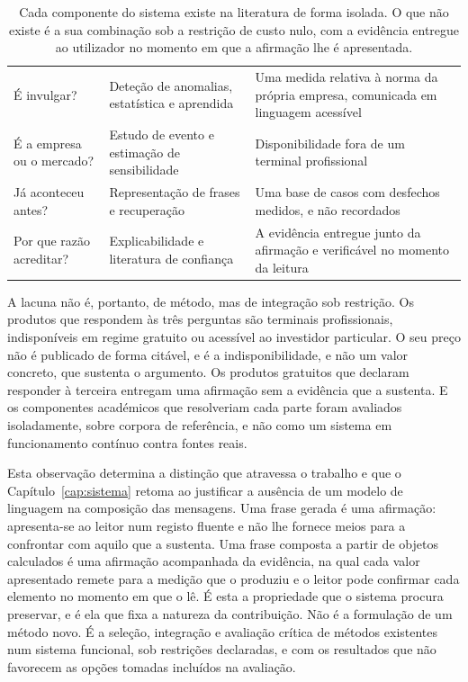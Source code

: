 \begin{table}[!htbp]
\caption[Posicionamento do trabalho face à literatura]{Cada componente do sistema existe na
literatura de forma isolada. O que não existe é a sua combinação sob a restrição de custo nulo, com
a evidência entregue ao utilizador no momento em que a afirmação lhe é apresentada.}
\label{tab:ctx_posicionamento}
\centering
\small
\begin{tabular}{L{0.24\textwidth} L{0.30\textwidth} L{0.34\textwidth}}
\toprule
{} &  &  \\
\midrule
É invulgar?
  & Deteção de anomalias, estatística e aprendida \autocite{chandola2009anomaly, liu2008isolation}
  & Uma medida relativa à norma da própria empresa, comunicada em linguagem acessível \\
\addlinespace
É a empresa ou o mercado?
  & Estudo de evento e estimação de sensibilidade \autocite{brown1985daily, vasicek1973beta}
  & Disponibilidade fora de um terminal profissional \\
\addlinespace
Já aconteceu antes?
  & Representação de frases e recuperação \autocite{reimers2019sbert, manning2008ir}
  & Uma base de casos com desfechos medidos, e não recordados \\
\addlinespace
Por que razão acreditar?
  & Explicabilidade e literatura de confiança \autocite{rudin2019stop, lee2004trust}
  & A evidência entregue junto da afirmação e verificável no momento da leitura \\
\bottomrule
\end{tabular}
\end{table}

A lacuna não é, portanto, de método, mas de integração sob restrição. Os produtos que respondem às três perguntas são terminais profissionais, indisponíveis em regime
gratuito ou acessível ao investidor particular. O seu preço não é publicado de forma citável, e é
a indisponibilidade, e não um valor concreto, que sustenta o argumento. Os produtos
gratuitos que declaram responder à terceira entregam uma afirmação sem a evidência que a sustenta.
E os componentes académicos que resolveriam cada parte foram avaliados isoladamente, sobre corpora
de referência, e não como um sistema em funcionamento contínuo contra fontes reais.

Esta observação determina a distinção que atravessa o trabalho e que o Capítulo~\ref{cap:sistema}
retoma ao justificar a ausência de um modelo de linguagem na composição das mensagens. Uma frase
gerada é uma afirmação: apresenta-se ao leitor num registo fluente e não lhe fornece meios para a
confrontar com aquilo que a sustenta. Uma frase composta a partir de objetos calculados é uma
afirmação acompanhada da evidência, na qual cada valor apresentado remete para a medição que o
produziu e o leitor pode confirmar cada elemento no momento em que o lê. É esta a propriedade que o sistema procura preservar, e é ela que fixa a natureza da contribuição.
Não é a formulação de um método novo. É a seleção, integração e avaliação crítica de métodos
existentes num sistema funcional, sob restrições declaradas, e com os resultados que não favorecem
as opções tomadas incluídos na avaliação.

